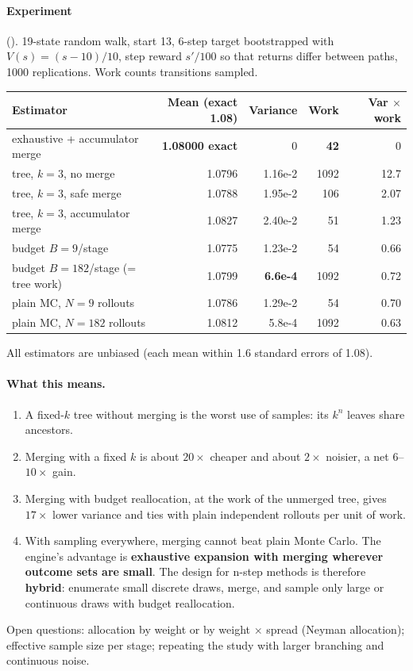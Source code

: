 \documentclass[11pt]{article}
\begin{document}
\paragraph{Experiment} (). 19-state random walk, start 13, 6-step target
bootstrapped with $V(s)=(s-10)/10$, step reward $s'/100$ so that returns differ between paths, 1000 replications.
Work counts transitions sampled.
\begin{center}
\small
\begin{tabular}{@{}lrrrr@{}}
\toprule
\textbf{Estimator} & \textbf{Mean} (exact 1.08) & \textbf{Variance} & \textbf{Work} & \textbf{Var $\times$ work}\\
\midrule
exhaustive + accumulator merge & \textbf{1.08000 exact} & 0 & \textbf{42} & 0\\
tree, $k=3$, no merge & 1.0796 & 1.16e-2 & 1092 & 12.7\\
tree, $k=3$, safe merge & 1.0788 & 1.95e-2 & 106 & 2.07\\
tree, $k=3$, accumulator merge & 1.0827 & 2.40e-2 & 51 & 1.23\\
budget $B=9$/stage & 1.0775 & 1.23e-2 & 54 & 0.66\\
budget $B=182$/stage (= tree work) & 1.0799 & \textbf{6.6e-4} & 1092 & 0.72\\
plain MC, $N=9$ rollouts & 1.0786 & 1.29e-2 & 54 & 0.70\\
plain MC, $N=182$ rollouts & 1.0812 & 5.8e-4 & 1092 & 0.63\\
\bottomrule
\end{tabular}
\end{center}
All estimators are unbiased (each mean within 1.6 standard errors of 1.08).

\paragraph{What this means.}
\begin{enumerate}
\item A fixed-$k$ tree without merging is the worst use of samples: its $k^n$ leaves share ancestors.
\item Merging with a fixed $k$ is about $20\times$ cheaper and about $2\times$ noisier, a net $6$--$10\times$ gain.
\item Merging with budget reallocation, at the work of the unmerged tree, gives $17\times$ lower variance and ties with
  plain independent rollouts per unit of work.
\item With sampling everywhere, merging cannot beat plain Monte Carlo. The engine's advantage is \textbf{exhaustive
  expansion with merging wherever outcome sets are small}. The design for n-step methods is therefore \textbf{hybrid}:
  enumerate small discrete draws, merge, and sample only large or continuous draws with budget reallocation.
\end{enumerate}
Open questions: allocation by weight or by weight $\times$ spread (Neyman allocation); effective sample size per stage;
repeating the study with larger branching and continuous noise.
\end{document}
